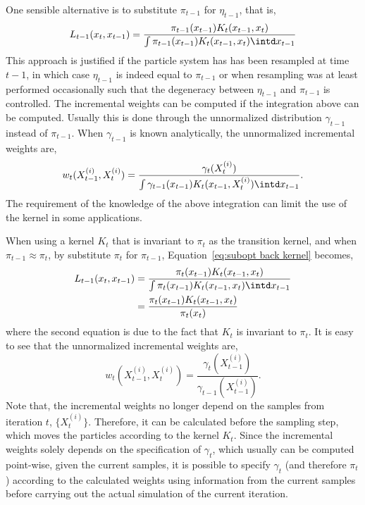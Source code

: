 One sensible alternative is to substitute $\pi_{t-1}$ for $\eta_{t-1}$, that
is,
\begin{equation}
  L_{t-1}(x_t,x_{t-1}) =
  \frac{\pi_{t-1}(x_{t-1})K_t(x_{t-1},x_t)}
  {\int \pi_{t-1}(x_{t-1})K_t(x_{t-1},x_t)\intd x_{t-1}}
  \label{eq:subopt back kernel}
\end{equation}
This approach is justified if the particle system has has been resampled at
time $t-1$, in which case $\eta_{t-1}$ is indeed equal to $\pi_{t-1}$ or when
resampling was at least performed occasionally such that the degeneracy
between $\eta_{t-1}$ and $\pi_{t-1}$ is controlled. The incremental weights
can be computed if the integration above can be computed. Usually this is done
through the unnormalized distribution $\gamma_{t-1}$ instead of $\pi_{t-1}$.
When $\gamma_{t-1}$ is known analytically, the unnormalized incremental
weights are,
\begin{equation}
  w_t(X_{t-1}^{(i)},X_t^{(i)}) =
  \frac{\gamma_t(X_t^{(i)})}
  {\int\gamma_{t-1}(x_{t-1})K_t(x_{t-1},X_t^{(i)})\intd x_{t-1}}.
  \label{eq:inc weight subopt}
\end{equation}
The requirement of the knowledge of the above integration can limit the use of
the kernel in some applications.

When using a \mcmc kernel $K_t$ that is invariant to $\pi_t$ as the
transition kernel, and when $\pi_{t-1}\approx\pi_t$, by substitute $\pi_t$
for $\pi_{t-1}$, Equation~\eqref{eq:subopt back kernel} becomes,
\begin{align}
  L_{t-1}(x_t,x_{t-1})
  &= \frac{\pi_t(x_{t-1})K_t(x_{t-1},x_t)}
  {\int \pi_t(x_{t-1})K_t(x_{t-1},x_t)\intd x_{t-1}} \notag\\
  &= \frac{\pi_t(x_{t-1})K_t(x_{t-1},x_t)}{\pi_t(x_t)}
  \label{eq:subopt back kernel mcmc}
\end{align}
where the second equation is due to the fact that $K_t$ is invariant to
$\pi_t$. It is easy to see that the unnormalized incremental weights are,
\begin{equation}
  w_t(X_{t-1}^{(i)},X_t^{(i)}) =
  \frac{\gamma_t(X_{t-1}^{(i)})}{\gamma_{t-1}(X_{t-1}^{(i)})}.
  \label{eq:inc weight subopt mcmc}
\end{equation}
Note that, the incremental weights no longer depend on the samples from
iteration $t$, $\{X_t^{(i)}\}$. Therefore, it can be calculated before the
sampling step, which moves the particles according to the kernel $K_t$. Since
the incremental weights solely depends on the specification of $\gamma_t$,
which usually can be computed point-wise, given the current samples, it is
possible to specify $\gamma_t$ (and therefore $\pi_t$) according to the
calculated weights using information from the current samples before carrying
out the actual simulation of the current iteration.

